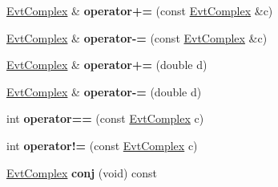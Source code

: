 \begin{DoxyCompactItemize}
\item 
\hypertarget{class_evt_complex_a0537bfbb177def45cca19cc99e225611}{}\hyperlink{class_evt_complex}{Evt\+Complex} \& {\bfseries operator+=} (const \hyperlink{class_evt_complex}{Evt\+Complex} \&c)\label{class_evt_complex_a0537bfbb177def45cca19cc99e225611}

\item 
\hypertarget{class_evt_complex_adf9fa439d6713391ab29cfc2d319a906}{}\hyperlink{class_evt_complex}{Evt\+Complex} \& {\bfseries operator-\/=} (const \hyperlink{class_evt_complex}{Evt\+Complex} \&c)\label{class_evt_complex_adf9fa439d6713391ab29cfc2d319a906}

\item 
\hypertarget{class_evt_complex_a1bb6aab3657fdef05b68dddbaf06f68d}{}\hyperlink{class_evt_complex}{Evt\+Complex} \& {\bfseries operator+=} (double d)\label{class_evt_complex_a1bb6aab3657fdef05b68dddbaf06f68d}

\item 
\hypertarget{class_evt_complex_ac9865f075c212c776d77d9ead1f78703}{}\hyperlink{class_evt_complex}{Evt\+Complex} \& {\bfseries operator-\/=} (double d)\label{class_evt_complex_ac9865f075c212c776d77d9ead1f78703}

\item 
\hypertarget{class_evt_complex_af6424cb6b3d5eaa9b07566934f40d037}{}int {\bfseries operator==} (const \hyperlink{class_evt_complex}{Evt\+Complex} c)\label{class_evt_complex_af6424cb6b3d5eaa9b07566934f40d037}

\item 
\hypertarget{class_evt_complex_a94ebe9ce554c5237bd99c2aad34331e2}{}int {\bfseries operator!=} (const \hyperlink{class_evt_complex}{Evt\+Complex} c)\label{class_evt_complex_a94ebe9ce554c5237bd99c2aad34331e2}

\item 
\hypertarget{class_evt_complex_a49955966285d85ae1fa47ade886bce83}{}\hyperlink{class_evt_complex}{Evt\+Complex} {\bfseries conj} (void) const \label{class_evt_complex_a49955966285d85ae1fa47ade886bce83}

\end{DoxyCompactItemize}
